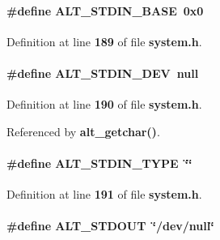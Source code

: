 \paragraph[{A\+L\+T\+\_\+\+S\+T\+D\+I\+N\+\_\+\+B\+A\+SE}]{\setlength{\rightskip}{0pt plus 5cm}\#define A\+L\+T\+\_\+\+S\+T\+D\+I\+N\+\_\+\+B\+A\+SE~0x0}\label{system_8h_afb60e0d366536aff816bd68076c14ae5}


Definition at line {\bf 189} of file {\bf system.\+h}.

\paragraph[{A\+L\+T\+\_\+\+S\+T\+D\+I\+N\+\_\+\+D\+EV}]{\setlength{\rightskip}{0pt plus 5cm}\#define A\+L\+T\+\_\+\+S\+T\+D\+I\+N\+\_\+\+D\+EV~null}\label{system_8h_a0e3c0e5c121845d15d610049cf3e8056}


Definition at line {\bf 190} of file {\bf system.\+h}.



Referenced by {\bf alt\+\_\+getchar()}.

\paragraph[{A\+L\+T\+\_\+\+S\+T\+D\+I\+N\+\_\+\+T\+Y\+PE}]{\setlength{\rightskip}{0pt plus 5cm}\#define A\+L\+T\+\_\+\+S\+T\+D\+I\+N\+\_\+\+T\+Y\+PE~\char`\"{}\char`\"{}}\label{system_8h_a4d4817f50f28396bb15fad435d974e46}


Definition at line {\bf 191} of file {\bf system.\+h}.

\paragraph[{A\+L\+T\+\_\+\+S\+T\+D\+O\+UT}]{\setlength{\rightskip}{0pt plus 5cm}\#define A\+L\+T\+\_\+\+S\+T\+D\+O\+UT~\char`\"{}/dev/null\char`\"{}}\label{system_8h_afe4f504b789c6991969d4340e95e9684}


